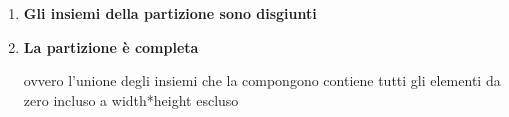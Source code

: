 \begin{itemize}
\begin{enumerate}
\begin{lstlisting}[language=Prolog]
    piece_is_valid(P) :- length(P, 1), !.
    piece_is_valid(P) :-
	    findall(X, (member(X, P), is_adiacent(X, P)), L),
	    length(L, LEN),
	    length(P, N),
	    LEN =:= N.

    is_adiacent(X, P) :-
	    member(Y, P),
	    are_adiacent(X, Y), !.
        \end{lstlisting}
        \item \textbf{Gli insiemi della partizione sono disgiunti}
        \item \textbf{La partizione è completa}\par
        ovvero l'unione degli insiemi che la compongono contiene tutti gli elementi da zero incluso a width*height escluso
    \end{enumerate}
\end{itemize}

